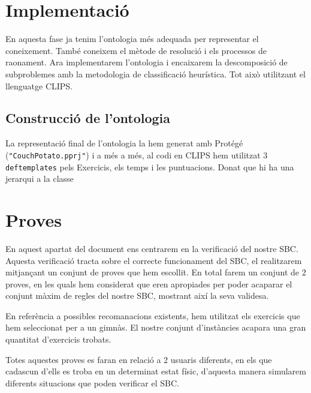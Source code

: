 \documentclass[a4paper, 12pt, UTF8]{article}
\begin{document}
\section{Implementació}

En aquesta fase ja tenim l'ontologia més adequada per representar el coneixement. També coneixem el mètode de resolució i els processos de raonament. Ara implementarem l'ontologia i encaixarem la descomposició de subproblemes amb la metodologia de classificació heurística. Tot això utilitzant el llenguatge CLIPS.

\subsection{Construcció de l'ontologia}

La representació final de l'ontologia la hem generat amb Protégé (\verb|"CouchPotato.pprj"|) i a més a més, al codi en CLIPS hem utilitzat 3 \verb|deftemplates| pels Exercicis, els temps i les puntuacions. Donat que hi ha una jerarqui a la classe 


\section{Proves}

En aquest apartat del document ens centrarem en la verificació del nostre SBC. Aquesta verificació tracta sobre el correcte funcionament del SBC, el realitzarem mitjançant un conjunt de proves que hem escollit. En total farem un conjunt de 2 proves, en les quals hem considerat que eren apropiades per poder acaparar el conjunt màxim de regles del nostre SBC, mostrant així la seva validesa.

En referència a possibles recomanacions existents, hem utilitzat els exercicis que hem seleccionat per a un gimnàs. El nostre conjunt d'instàncies acapara una gran quantitat d'exercicis trobats. 

Totes aquestes proves es faran en relació a 2 usuaris diferents, en els que cadascun d'ells es troba en un determinat estat físic, d'aquesta manera simularem diferents situacions que poden verificar el SBC.
\end{document}
